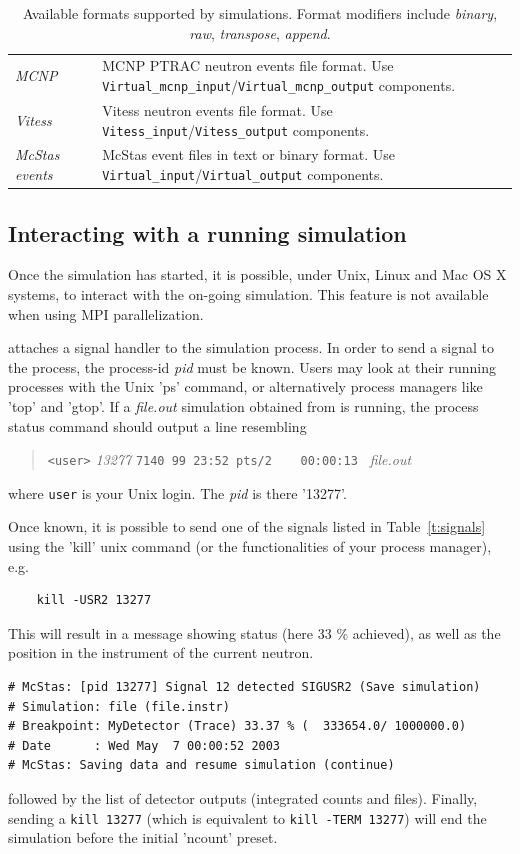 \begin{table}
\begin{center}
{\begin{tabular}{|p{}|c|p{}|}
      {\it MCNP} &  & MCNP PTRAC neutron events file format. Use
        \verb+Virtual_mcnp_input+/\verb+Virtual_mcnp_output+ components.\index{MCNP}\\
      {\it Vitess} &  & Vitess neutron events file format. Use \verb+Vitess_input+/\verb+Vitess_output+ components.\index{Vitess}\\
      {\it McStas events} & & McStas event files in text or binary
      format. Use \verb+Virtual_input+/\verb+Virtual_output+ components.\\
      \hline
    \end{tabular}
    \caption{Available formats supported by \MCS simulations. Format modifiers include \emph{binary}, \emph{raw}, \emph{transpose}, \emph{append}.}
    \label{t:formatoptions}
    }
  \end{center}
\end{table}

\subsection{Interacting with a running simulation}

Once the simulation has started, it is possible, under Unix, Linux and Mac OS X systems, to interact with the on-going simulation. This feature is not available when using MPI parallelization.

\MCS attaches a signal handler to the simulation process. In order to send a signal to the process, the process-id {\it pid} must be known. Users may look at their running processes with the Unix 'ps' command, or alternatively process managers like 'top' and 'gtop'.
If a {\it file.out} simulation obtained from \MCS is running, the process status command should output a line resembling
\begin{quote}
  \verb|<user>| {\it 13277} \verb|7140 99 23:52 pts/2    00:00:13 | {\it file.out}\\
\end{quote}
where \verb+user+ is your Unix login. The {\it pid} is there '13277'.

Once known, it is possible to send one of the signals listed in Table~\ref{t:signals} using the 'kill' unix command (or the functionalities of your process manager), e.g.
\begin{lstlisting}
    kill -USR2 13277
\end{lstlisting}
This will result in a message showing status (here 33 \% achieved), as well as the position in the instrument of the current neutron.
\begin{lstlisting}
# McStas: [pid 13277] Signal 12 detected SIGUSR2 (Save simulation)
# Simulation: file (file.instr)
# Breakpoint: MyDetector (Trace) 33.37 % (  333654.0/ 1000000.0)
# Date      : Wed May  7 00:00:52 2003
# McStas: Saving data and resume simulation (continue)
\end{lstlisting}
followed by the list of detector outputs (integrated counts and files). Finally, sending a \verb+kill 13277+ (which is equivalent to \verb+kill -TERM 13277+) will end the simulation before the initial 'ncount' preset.

